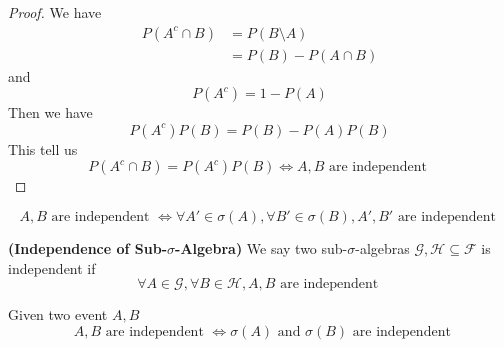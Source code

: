 \documentclass{report}
\begin{document}
\begin{proof}
We have 
\begin{align*}
P\left(A^c \cap B \right)&=P\left(B\setminus A \right)\\
&=P\left(B \right)-P\left(A\cap B \right)
\end{align*}
and
\begin{equation*}
P\left(A^c \right)=1-P\left(A \right)
\end{equation*}
Then we have 
\begin{equation*}
P\left(A^c \right)P\left(B \right)=P\left(B \right)-P\left(A \right)P\left(B \right)
\end{equation*}
This tell us 
\begin{equation*}
P\left(A^c\cap B \right)=P\left(A^c \right)P\left(B \right)\iff A,B\text{ are independent }
\end{equation*}
\end{proof}
\begin{corollary}
\label{3.1.5}
\begin{equation*}
A,B\text{ are independent }\iff  \forall A'\in \sigma\left(A \right),\forall B'\in \sigma\left(B \right), A',B'\text{ are independent }
\end{equation*}
\end{corollary}
\begin{definition}
\label{3.1.6}
\textbf{(Independence of Sub-$\sigma$-Algebra)} We say two sub-$\sigma$-algebras $\mathcal{G},\mathcal{H}\subseteq \mathcal{F}$ is independent if 
\begin{equation*}
\forall A\in \mathcal{G},\forall B\in \mathcal{H}, A,B\text{ are independent }
\end{equation*}
\end{definition}
\begin{corollary}
\label{3.1.7}
Given two event $A,B$
\begin{equation*}
\text{ $A,B$ are independent }\iff  \sigma\left(A \right)\text{ and }\sigma\left(B \right)\text{ are independent }
\end{equation*}
\end{corollary}
\end{document}
